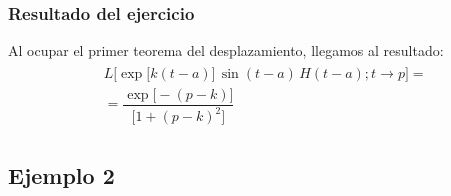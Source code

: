 \documentclass[12pt]{beamer}
\begin{document}
\begin{frame}
\frametitle{Resultado del ejercicio}
Al ocupar el primer teorema del desplazamiento, llegamos al resultado:
\pause
\begin{eqnarray*}
\begin{aligned}
&L \big[ \exp\big[k (t - a) \big] \, \sin (t - a) \, H (t - a); t \to p  \big] = \\[0.5em]
&= \dfrac{\exp\big[ -(p - k) \big]}{\big[ 1 + (p - k)^{2} \big]}
\end{aligned}
\end{eqnarray*}
\end{frame}

\subsection{Ejemplo 2}
\end{document}
